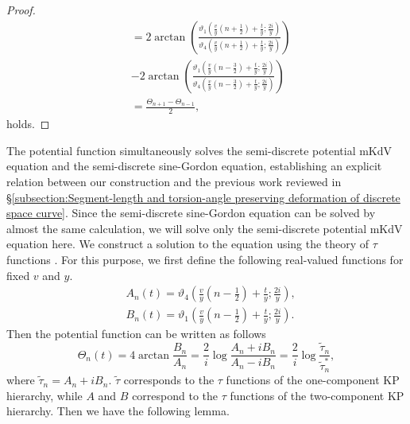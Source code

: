 \documentclass[10pt,leqno]{amsart}
\numberwithin{equation}{section}
\begin{document}
\begin{proof}
\begin{equation}
\begin{split}
&=2\arctan\left(\frac{\vartheta_{1}\left(\frac{v}{y}\left(n+\frac{1}{2}\right)+\frac{t}{y}; \frac{2i}{y}\right)}{\vartheta_{4}\left(\frac{v}{y}\left(n+\frac{1}{2}\right)+\frac{t}{y}; \frac{2i}{y}\right)}\right)\\
&-2\arctan\left(\frac{\vartheta_{1}\left(\frac{v}{y}\left(n-\frac{3}{2}\right)+\frac{t}{y}; \frac{2i}{y}\right)}{\vartheta_{4}\left(\frac{v}{y}\left(n-\frac{3}{2}\right)+\frac{t}{y}; \frac{2i}{y}\right)}\right)\\
&=\frac{\Theta_{n+1}-\Theta_{n-1}}{2},
\end{split}
\end{equation}
holds. 
\end{proof}
The potential function simultaneously solves the semi-discrete potential mKdV equation and the semi-discrete sine-Gordon equation, establishing an explicit relation between our construction and the previous work \cite{KKP:linkage} reviewed in \S \ref{subsection:Segment-length and torsion-angle preserving deformation of discrete space curve}.
Since the semi-discrete sine-Gordon equation can be solved by almost the same calculation, we will solve only the semi-discrete potential mKdV equation here.
We construct a solution to the equation using the theory of $\tau$ functions \cite{inoguchi2012motion}.
For this purpose, we first define the following real-valued functions for fixed $v$ and $y$.
\begin{equation}\label{sdm-6}
\begin{split}
&A_{n}\left(t\right)=\vartheta_4\left(\frac{v}{y}\left(n-\frac{1}{2}\right)+\frac{t}{y};\frac{2i}{y}\right),\\
&B_{n}\left(t\right)=\vartheta_1\left(\frac{v}{y}\left(n-\frac{1}{2}\right)+\frac{t}{y};\frac{2i}{y}\right).
\end{split}
\end{equation}
Then the potential function can be written as follows
\begin{equation}\label{sdm-2}
\Theta_{n}\left(t\right)=4\arctan\frac{B_{n}}{A_{n}}=\frac{2}{i}\log\frac{A_{n}+iB_{n}}{A_{n}-iB_{n}}=\frac{2}{i}\log\frac{\widetilde{\tau}_n}{\widetilde{\tau}^{*}_{n}},
\end{equation}
where $\widetilde{\tau}_{n}=A_{n}+iB_{n}$.
$\widetilde{\tau}$ corresponds to the $\tau$ functions of the one-component KP hierarchy, while $A$ and $B$ correspond to the $\tau$ functions of the two-component KP hierarchy.
Then we have the following lemma.
\end{document}
